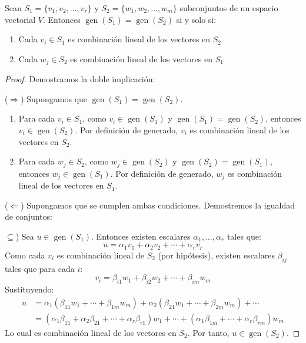 \begin{theorem} 
Sean $S_1 = \{v_1, v_2, \dots, v_r\}$ y $S_2 = \{w_1, w_2, \dots, w_m\}$ subconjuntos de un espacio vectorial $V$. Entonces $\operatorname{gen}(S_1) = \operatorname{gen}(S_2)$ si y solo si:
\begin{enumerate}
\item Cada $v_i \in S_1$ es combinación lineal de los vectores en $S_2$
\item Cada $w_j \in S_2$ es combinación lineal de los vectores en $S_1$
\end{enumerate}
\end{theorem}

\begin{proof}
Demostramos la doble implicación:

($\Rightarrow$) Supongamos que $\operatorname{gen}(S_1) = \operatorname{gen}(S_2)$. 
\begin{enumerate}
\item Para cada $v_i \in S_1$, como $v_i \in \operatorname{gen}(S_1)$ y $\operatorname{gen}(S_1) = \operatorname{gen}(S_2)$, entonces $v_i \in \operatorname{gen}(S_2)$. Por definición de generado, $v_i$ es combinación lineal de los vectores en $S_2$.

\item Para cada $w_j \in S_2$, como $w_j \in \operatorname{gen}(S_2)$ y $\operatorname{gen}(S_2) = \operatorname{gen}(S_1)$, entonces $w_j \in \operatorname{gen}(S_1)$. Por definición de generado, $w_j$ es combinación lineal de los vectores en $S_1$.
\end{enumerate}

($\Leftarrow$) Supongamos que se cumplen ambas condiciones. Demostremos la igualdad de conjuntos:

$\subseteq$) Sea $u \in \operatorname{gen}(S_1)$. Entonces existen escalares $\alpha_1, \dots, \alpha_r$ tales que:
\[u = \alpha_1 v_1 + \alpha_2 v_2 + \cdots + \alpha_r v_r\]
Como cada $v_i$ es combinación lineal de $S_2$ (por hipótesis), existen escalares $\beta_{ij}$ tales que para cada $i$:
\[v_i = \beta_{i1} w_1 + \beta_{i2} w_2 + \cdots + \beta_{im} w_m\]
Sustituyendo:
\begin{align*}
u &= \alpha_1 (\beta_{11} w_1 + \cdots + \beta_{1m} w_m) + \alpha_2 (\beta_{21} w_1 + \cdots + \beta_{2m} w_m) + \cdots \\
&= (\alpha_1 \beta_{11} + \alpha_2 \beta_{21} + \cdots + \alpha_r \beta_{r1}) w_1 + \cdots + (\alpha_1 \beta_{1m} + \cdots + \alpha_r \beta_{rm}) w_m
\end{align*}
Lo cual es combinación lineal de los vectores en $S_2$. Por tanto, $u \in \operatorname{gen}(S_2)$.


\end{proof}
